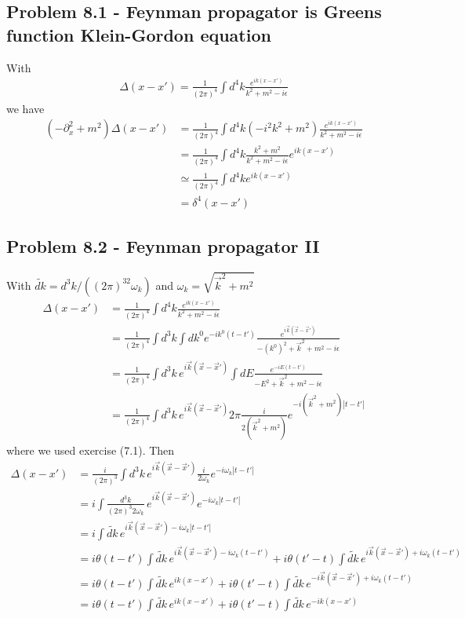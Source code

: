 \documentclass[../main.tex]{subfiles}
\begin{document}
\subsection{Problem 8.1 - Feynman propagator is Greens function Klein-Gordon equation}
With
\begin{align}
\Delta(x-x')=\frac{1}{(2\pi)^4}\int d^4k\frac{e^{ik(x-x')}}{k^2+m^2-i\epsilon}
\end{align}
we have
\begin{align}
(-\partial_x^2+m^2)\Delta(x-x')
&=\frac{1}{(2\pi)^4}\int d^4k(-i^2k^2+m^2)\frac{e^{ik(x-x')}}{k^2+m^2-i\epsilon}\\
&=\frac{1}{(2\pi)^4}\int d^4k\frac{k^2+m^2}{k^2+m^2-i\epsilon}e^{ik(x-x')}\\
&\simeq\frac{1}{(2\pi)^4}\int d^4ke^{ik(x-x')}\\
&=\delta^4(x-x')
\end{align}

\subsection{Problem 8.2 - Feynman propagator II}
With $\widetilde{dk}=d^3k/((2\pi)^32\omega_k)$ and $\omega_k=\sqrt{\vec{k}^2+m^2}$
\begin{align}
\Delta(x-x')
&=\frac{1}{(2\pi)^4}\int d^4k\frac{e^{ik(x-x')}}{k^2+m^2-i\epsilon}\\
&=\frac{1}{(2\pi)^4}\int d^3k\int dk^0e^{-ik^0(t-t')}\frac{e^{i\vec{k}(\vec{x}-\vec{x}')}}{-(k^0)^2+\vec{k}^2+m^2-i\epsilon}\\
&=\frac{1}{(2\pi)^4}\int d^3k\,e^{i\vec{k}(\vec{x}-\vec{x}')}\int dE\frac{e^{-iE(t-t')}}{-E^2+\vec{k}^2+m^2-i\epsilon}\\
&=\frac{1}{(2\pi)^4}\int d^3k\,e^{i\vec{k}(\vec{x}-\vec{x}')}2\pi\frac{i}{2(\vec{k}^2+m^2)}e^{-i(\vec{k}^2+m^2)|t-t'|}
\end{align}
where we used exercise (7.1). Then
\begin{align}
\Delta(x-x')
&=\frac{i}{(2\pi)^3}\int d^3k\,e^{i\vec{k}(\vec{x}-\vec{x}')}\frac{i}{2\omega_k}e^{-i\omega_k|t-t'|}\\
&=i\int\frac{d^3k}{(2\pi)^3 2\omega_k}\,e^{i\vec{k}(\vec{x}-\vec{x}')}e^{-i\omega_k|t-t'|}\\
&=i\int\widetilde{dk}\,e^{i\vec{k}(\vec{x}-\vec{x}')-i\omega_k|t-t'|}\\
&=i\theta(t-t')\int\widetilde{dk}\,e^{i\vec{k}(\vec{x}-\vec{x}')-i\omega_k(t-t')}+i\theta(t'-t)\int\widetilde{dk}\,e^{i\vec{k}(\vec{x}-\vec{x}')+i\omega_k(t-t')}\\
&=i\theta(t-t')\int\widetilde{dk}\,e^{ik(x-x')}+i\theta(t'-t)\int\widetilde{dk}\,e^{-i\vec{k}(\vec{x}-\vec{x}')+i\omega_k(t-t')}\\
&=i\theta(t-t')\int\widetilde{dk}\,e^{ik(x-x')}+i\theta(t'-t)\int\widetilde{dk}\,e^{-ik(x-x')}\\
\end{align}
\end{document}
